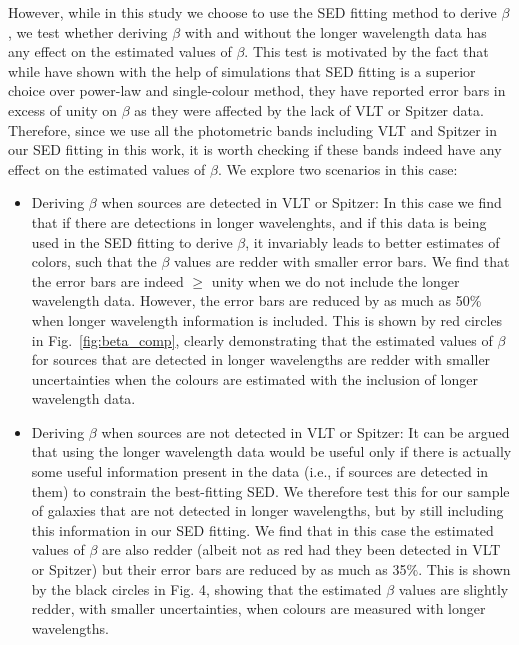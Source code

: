 \documentclass[twocolumn]{aastex63}
\begin{document}
However, while in this study we choose to use the SED fitting method to derive $\beta$, we test whether deriving $\beta$ with and without the longer wavelength data has any effect on the estimated values of $\beta$. This test is motivated by the fact that while \citet{Finkelstein2012} have shown with the help of simulations that SED fitting is a superior choice over power-law and single-colour method, they have reported error bars in excess of unity on $\beta$ as they were affected by the lack of VLT or Spitzer data. Therefore, since we use all the photometric bands including VLT and Spitzer in our SED fitting in this work, it is worth checking if these bands indeed have any effect on the estimated values of $\beta$. We explore two scenarios in this case:
\begin{itemize}
\item
Deriving $\beta$ when sources are detected in VLT or Spitzer: In this case we find that if there are detections in longer wavelenghts, and if this data is being used in the SED fitting to derive $\beta$, it invariably leads to better estimates of colors, such that the $\beta$ values are redder with smaller error bars. We find that the error bars are indeed $\geq$ unity when we do not include the longer wavelength data. However, the error bars are reduced by as much as 50$\%$ when longer wavelength information is included. This is shown by red circles in Fig.~\ref{fig:beta_comp}, clearly demonstrating that the estimated values of $\beta$ for sources that are detected in longer wavelengths are redder with smaller uncertainties when the colours are estimated with the inclusion of longer wavelength data.
\item
Deriving $\beta$ when sources are not detected in VLT or Spitzer: It can be argued that using the longer wavelength data would be useful only if there is actually some useful information present in the data (i.e., if sources are detected in them) to constrain the best-fitting SED. We therefore test this for our sample of galaxies that are not detected in longer wavelengths, but by still including this information in our SED fitting. We find that in this case the estimated values of $\beta$ are also redder (albeit not as red had they been detected in VLT or Spitzer) but their error bars are reduced by as much as 35$\%$. This is shown by the black circles in Fig. 4, showing that the estimated $\beta$ values are slightly redder, with smaller uncertainties, when colours are measured with longer wavelengths.
\end{itemize}
\end{document}
